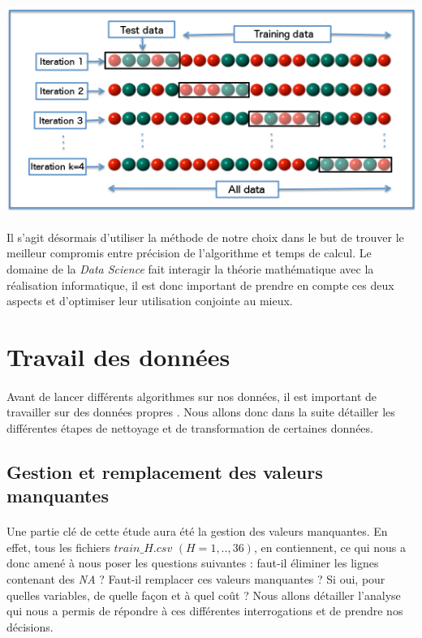 \documentclass[14pt, openany]{article}
\begin{document}
\paragraph{}
\includegraphics[width=17cm]{Images/k_fold.jpg}
\begin{center}
\label{fig1}
\end{center}
\paragraph{}
Il s'agit désormais d'utiliser la méthode de notre choix dans le but de trouver le meilleur compromis entre précision de l'algorithme et temps de calcul. Le domaine de la \textit{Data Science} fait interagir la théorie mathématique avec la réalisation informatique, il est donc important de prendre en compte ces deux aspects et d'optimiser leur utilisation conjointe au mieux.

\section{Travail des données}
\paragraph{}
Avant de lancer différents algorithmes sur nos données, il est important de travailler sur des données \og propres \fg{}. Nous allons donc dans la suite détailler les différentes étapes de nettoyage et de transformation de certaines données.
\subsection{Gestion et remplacement des valeurs manquantes}
\paragraph{}
Une partie clé de cette étude aura été la gestion des valeurs manquantes. En effet, tous les fichiers $train\_H.csv$ $(H=1,..,36)$, en contiennent, ce qui nous a donc amené à nous poser les questions suivantes : faut-il éliminer les lignes contenant des \textit{NA} ? Faut-il remplacer ces valeurs manquantes ? Si oui, pour quelles variables, de quelle façon et à quel coût ? Nous allons détailler l'analyse qui nous a permis de répondre à ces différentes interrogations et de prendre nos décisions.
\end{document}
